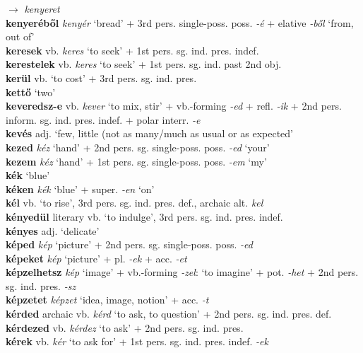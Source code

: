 \documentclass[11pt]{article}
\begin{document}
$\rightarrow$ \emph{kenyeret} \\
\textbf{kenyeréből} \emph{kenyér} `bread' + 3rd
pers. single\hyp{}poss. poss. \emph{-é} + elative \emph{-ből} `from, out of' \\
\textbf{keresek} vb. \emph{keres} `to seek' + 1st
pers. sg. ind. pres. indef. \\
\textbf{kerestelek} vb. \emph{keres} `to seek' + 1st
pers. sg. ind. past 2nd obj. \\
\textbf{kerül} vb. `to cost' + 3rd pers. sg. ind. pres. \\
\textbf{kettő} `two' \\
\textbf{keveredsz-e} vb. \emph{kever} `to mix, stir' +
vb.\hyp{}forming \emph{-ed}
+ refl. \emph{-ik} + 2nd pers. inform. sg. ind. pres. indef. + polar
interr. \emph{-e} \\
\textbf{kevés} adj. `few, little (not as many/much as usual or as expected' \\
\textbf{kezed} \emph{kéz} `hand' + 2nd
pers. sg. single\hyp{}poss. poss. \emph{-ed} `your' \\
\textbf{kezem} \emph{kéz} `hand' + 1st
pers. sg. single\hyp{}poss. poss. \emph{-em} `my' \\
\textbf{kék} `blue' \\
\textbf{kéken} \emph{kék} `blue' +
super. \emph{-en} `on' \\
\textbf{kél} vb. `to rise', 3rd pers. sg. ind. pres. def.,
  archaic alt. \emph{kel} \\
\textbf{kényedül} literary vb. `to indulge', 3rd
pers. sg. ind. pres. indef. \\
\textbf{kényes} adj. `delicate' \\
\textbf{képed} \emph{kép} `picture' + 2nd
pers. sg. single\hyp{}poss. poss. \emph{-ed} \\
\textbf{képeket} \emph{kép} `picture' + pl. \emph{-ek} + acc. \emph{-et} \\
\textbf{képzelhetsz} \emph{kép} `image' + vb.-forming \emph{-zel}:
`to imagine' + pot. \emph{-het} + 2nd
pers. sg. ind. pres. \emph{-sz} \\
\textbf{képzetet} \emph{képzet} `idea, image, notion' +
acc. \emph{-t} \\
\textbf{kérded} archaic vb. \emph{kérd} `to ask, to question' + 2nd
pers. sg. ind. pres. def. \\
\textbf{kérdezed} vb. \emph{kérdez} `to ask' + 2nd
pers. sg. ind. pres. \\
\textbf{kérek} vb. \emph{kér} `to ask for' + 1st
pers. sg. ind. pres. indef. \emph{-ek} \\
\end{document}
